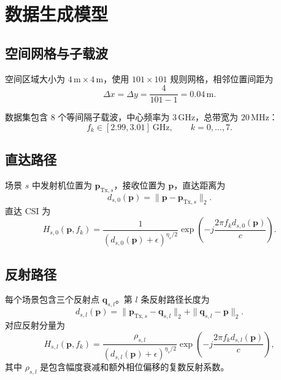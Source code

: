 \documentclass[UTF8,a4paper,11pt]{ctexart}
\begin{document}
\section{数据生成模型}

\subsection{空间网格与子载波}

空间区域大小为 $4\,\mathrm m\times4\,\mathrm m$，使用 $101\times101$ 规则网格，相邻位置间距为
\begin{equation}
    \Delta x=\Delta y=\frac{4}{101-1}=0.04\,\mathrm m.
\end{equation}

数据集包含 8 个等间隔子载波，中心频率为 $3\,\mathrm{GHz}$，总带宽为 $20\,\mathrm{MHz}$：
\begin{equation}
    f_k\in[2.99,3.01]~\mathrm{GHz},\qquad k=0,\ldots,7.
\end{equation}

\subsection{直达路径}

场景 $s$ 中发射机位置为 $\mathbf p_{\mathrm{Tx},s}$，接收位置为 $\mathbf p$，直达距离为
\begin{equation}
    d_{s,0}(\mathbf p)=
    \|\mathbf p-\mathbf p_{\mathrm{Tx},s}\|_2.
\end{equation}
直达 CSI 为
\begin{equation}
    H_{s,0}(\mathbf p,f_k)=
    \frac{1}{(d_{s,0}(\mathbf p)+\epsilon)^{\eta_s/2}}
    \exp\left(-j\frac{2\pi f_k d_{s,0}(\mathbf p)}{c}\right).
\end{equation}

\subsection{反射路径}

每个场景包含三个反射点 $\mathbf q_{s,l}$。第 $l$ 条反射路径长度为
\begin{equation}
    d_{s,l}(\mathbf p)=
    \|\mathbf p_{\mathrm{Tx},s}-\mathbf q_{s,l}\|_2
    +\|\mathbf q_{s,l}-\mathbf p\|_2.
\end{equation}
对应反射分量为
\begin{equation}
    H_{s,l}(\mathbf p,f_k)=
    \frac{\rho_{s,l}}{(d_{s,l}(\mathbf p)+\epsilon)^{\eta_s/2}}
    \exp\left(-j\frac{2\pi f_k d_{s,l}(\mathbf p)}{c}\right),
\end{equation}
其中 $\rho_{s,l}$ 是包含幅度衰减和额外相位偏移的复数反射系数。
\end{document}
